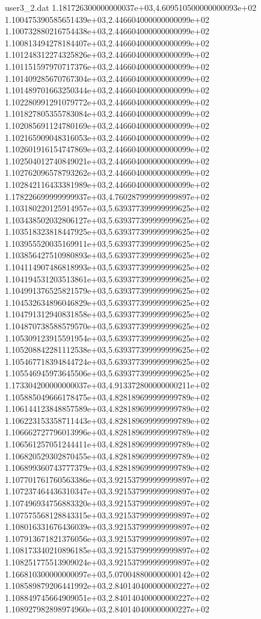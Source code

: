 \begin{filecontents}{user3_2.dat}
1.181726300000000037e+03,4.609510500000000093e+02
1.100475390585651439e+03,2.446604000000000099e+02
1.100732880216754438e+03,2.446604000000000099e+02
1.100813494278184407e+03,2.446604000000000099e+02
1.101248312274325826e+03,2.446604000000000099e+02
1.101151597970717376e+03,2.446604000000000099e+02
1.101409285670767304e+03,2.446604000000000099e+02
1.101489701663250344e+03,2.446604000000000099e+02
1.102280991291079772e+03,2.446604000000000099e+02
1.101827805355783084e+03,2.446604000000000099e+02
1.102085691124780169e+03,2.446604000000000099e+02
1.102165909048316053e+03,2.446604000000000099e+02
1.102601916154747869e+03,2.446604000000000099e+02
1.102504012740849021e+03,2.446604000000000099e+02
1.102762096578793262e+03,2.446604000000000099e+02
1.102842116433381989e+03,2.446604000000000099e+02
1.178226699999999937e+03,4.760287999999999897e+02
1.103180220125914957e+03,5.639377399999999625e+02
1.103438502032806127e+03,5.639377399999999625e+02
1.103518323818447925e+03,5.639377399999999625e+02
1.103955520035169911e+03,5.639377399999999625e+02
1.103856427510980893e+03,5.639377399999999625e+02
1.104114907486818993e+03,5.639377399999999625e+02
1.104194531203513861e+03,5.639377399999999625e+02
1.104991376525821579e+03,5.639377399999999625e+02
1.104532634896046829e+03,5.639377399999999625e+02
1.104791312940831858e+03,5.639377399999999625e+02
1.104870738588579570e+03,5.639377399999999625e+02
1.105309123915591954e+03,5.639377399999999625e+02
1.105208842281112538e+03,5.639377399999999625e+02
1.105467718394844724e+03,5.639377399999999625e+02
1.105546945973645506e+03,5.639377399999999625e+02
1.173304200000000037e+03,4.913372800000000211e+02
1.105885049666178475e+03,4.828189699999999789e+02
1.106144123848857589e+03,4.828189699999999789e+02
1.106223153358711443e+03,4.828189699999999789e+02
1.106662727796013996e+03,4.828189699999999789e+02
1.106561257051244411e+03,4.828189699999999789e+02
1.106820529302870455e+03,4.828189699999999789e+02
1.106899360743777379e+03,4.828189699999999789e+02
1.107701761760563386e+03,3.921537999999999897e+02
1.107237464436310347e+03,3.921537999999999897e+02
1.107496934756883320e+03,3.921537999999999897e+02
1.107575568128843315e+03,3.921537999999999897e+02
1.108016331676436039e+03,3.921537999999999897e+02
1.107913671821376056e+03,3.921537999999999897e+02
1.108173340210896185e+03,3.921537999999999897e+02
1.108251775513909024e+03,3.921537999999999897e+02
1.166810300000000097e+03,5.070048800000000142e+02
1.108589879206441992e+03,2.840140400000000227e+02
1.108849745664909051e+03,2.840140400000000227e+02
1.108927982898974960e+03,2.840140400000000227e+02

\end{filecontents}
